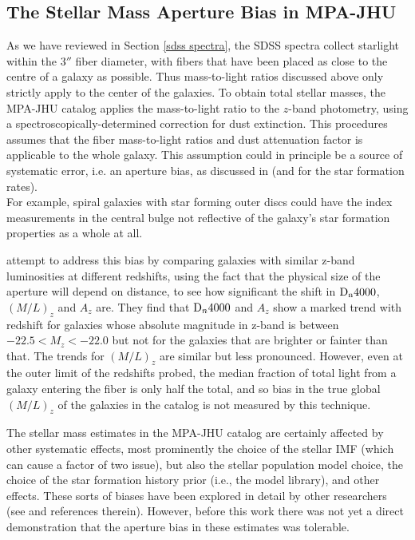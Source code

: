\subsection{The Stellar Mass Aperture Bias in MPA-JHU}
\label{apercorr}

As we have reviewed in Section \ref{sdss spectra}, the SDSS spectra 
collect starlight within the 3$''$ fiber diameter, with fibers that 
have been placed as close to the centre of a galaxy as possible.
Thus mass-to-light ratios discussed above only strictly apply to the
center of the galaxies.
To obtain total stellar masses, the MPA-JHU catalog 
applies the mass-to-light ratio to the $z$-band photometry, using
a spectroscopically-determined correction for dust extinction.
This procedures assumes that the fiber mass-to-light ratios and 
dust attenuation factor is applicable to the whole galaxy. This
assumption could in principle be a source of systematic error,
i.e. an  aperture bias, as discussed in \citet{kauffmann_stellar_2003} 
(and \citet{brinchmann_physical_2004} for the star formation rates).\\
For example,  spiral galaxies with star forming outer discs could have 
the index measurements in the central bulge not reflective of the 
galaxy's star formation properties as a whole at all. 

\citet{kauffmann_stellar_2003} attempt to address this 
bias by comparing galaxies with similar z-band luminosities 
at different redshifts, using the fact that the physical
size of the aperture will depend on distance,
to see how significant the shift in ${\rm D}_{\rm n}4000$,
$(M/L)_{z}$ and $A_{z}$ are. They find that ${\rm D}_{n}4000$ 
and $A_{z}$ show a marked trend with redshift for galaxies 
whose absolute magnitude in z-band is between 
$-22.5 < M_{z} < -22.0$  but not for the galaxies that are 
brighter or fainter than that. The trends for $(M/L)_{z}$ are 
similar but less pronounced. However, even at the outer limit 
of the redshifts probed, the median fraction of total light 
from a galaxy entering the fiber is only half the total, and 
so bias in the true global $(M/L)_{z}$ of the galaxies in the catalog 
is not measured by this technique. 

The stellar mass estimates in the MPA-JHU catalog are 
certainly affected by other systematic effects, most
prominently the  choice of the stellar IMF (which can cause 
a factor of two issue), but also the stellar population 
model choice, the choice of the star formation history prior 
(i.e., the model library), and other effects. These sorts
of biases have been explored in detail by other researchers
(see \citealt{conroy_modeling_2013} and references therein).
However, before this work there was not yet a direct 
demonstration that the aperture bias in these estimates 
was tolerable.


